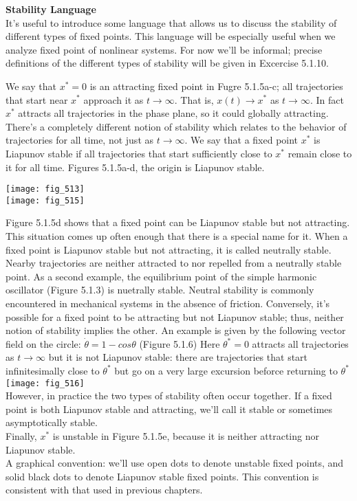 \documentclass{article}
\newcommand\tab[1][1cm]{\hspace*{#1}}
\begin{document}
\textbf {Stability Language} \\ \tab
It's useful to introduce some language that allows us to discuss the stability of different types of fixed points. This language will be especially useful when we analyze fixed point of nonlinear systems. For now we'll be informal; precise definitions of the different types of stability will be given in Excercise 5.1.10.

\tab We say that $x^{*}=0$ is an attracting fixed point in Fugre 5.1.5a-c; all trajectories that start near $x^{*}$ approach it as $t \to \infty$. That is, $x(t) \to x^{*}$ as $t \to \infty$. In fact $x^{*}$ attracts all trajectories in the phase plane, so it could globally attracting. There's a completely different notion of stability which relates to the behavior of trajectories for all time, not just as $t \to \infty$. We say that a fixed point $x^{*}$ is Liapunov stable if all trajectories that start sufficiently close to $x^{*}$ remain close to it for all time. Figures 5.1.5a-d, the origin is Liapunov stable. \\ \tab

\texttt{[image: fig\_513]}
\\ 
\texttt{[image: fig\_515]}

Figure 5.1.5d shows that a fixed point can be Liapunov stable but not attracting. This situation comes up often enough that there is a special name for it. When a fixed point is Liapunov stable but not attracting, it is called neutrally stable. Nearby trajectories are neither attracted to nor repelled from a neutrally stable point. As a second example, the equilibrium point of the simple harmonic oscillator (Figure 5.1.3) is nuetrally stable. Neutral stability is commonly encountered in mechanical systems in the absence of friction. Conversely, it's possible for a fixed point to be attracting but not Liapunov stable; thus, neither notion of stability implies the other. An example is given by the following vector field on the circle: $\dot{\theta}=1-cos\theta$ (Figure 5.1.6) Here $\theta^{*}=0$ attracts all trajectories as $t \to \infty $ but it is not Liapunov stable: there are trajectories that start infinitesimally close to $\theta^{*}$ but go on a very large excursion beforce returning to $\theta^{*}$ \\

\texttt{[image: fig\_516]}
\\ 

However, in practice the two types of stability often occur together. If a fixed point is both Liapunov stable and attracting, we'll call it stable or sometimes asymptotically stable. \\ \tab
Finally, $x^{*}$ is unstable in Figure 5.1.5e, because it is neither attracting nor Liapunov stable. \\ \tab
A graphical convention: we'll use open dots to denote unstable fixed points, and solid black dots to denote Liapunov stable fixed points. This convention is consistent with that used in previous chapters.
\end{document}
